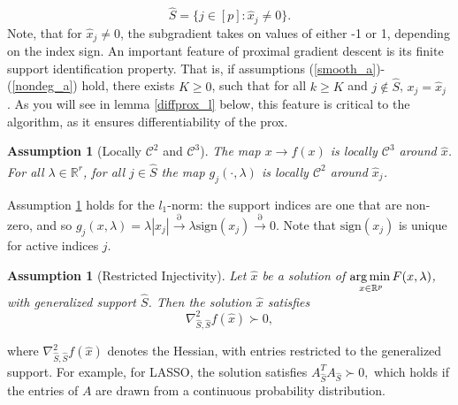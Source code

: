 \documentclass[11pt, twoside]{report}
\newtheorem{assumption}[theorem]{Assumption}
\begin{document}
\[\hat{S} = \{j \in [p]: \hat{x}_j \neq 0\}.\]
Note, that for $\hat{x}_j \neq 0$, the subgradient takes on values of either -1 or 1, depending on the index sign. An important feature of proximal gradient descent is its finite support identification property. That is, if assumptions (\ref{smooth_a})-(\ref{nondeg_a}) hold, there exists $K \geq 0$, such that for all $k \geq K$ and $j \notin \hat{S}$, $x_j = \hat{x}_j$ \cite{liang2017activity}. As you will see in lemma \ref{diffprox_l} below, this feature is critical to the algorithm, as it ensures differentiability of the prox.%
\begin{assumption}[Locally $\mathcal{C}^2$ and $\mathcal{C}^3$]
\label{locsmooth_a}
The map $x \xrightarrow[]{} f(x)$ is locally $\mathcal{C}^3$ around $\hat{x}$. For all $\lambda \in \mathbb{R}^r$, for all $j \in \hat{S}$ the map $g_j(\cdot,\lambda)$ is locally $\mathcal{C}^2$ around $\hat{x}_j$.
\end{assumption}
Assumption \ref{locsmooth_a} holds for the $l_1$-norm: the support indices are one that are non-zero, and so $g_j(x,\lambda) = \lambda|x_j| \xrightarrow[]{\partial} \lambda\mathrm{sign}(x_j) \xrightarrow[]{\partial} 0.$ Note that $\mathrm{sign}(x_j)$ is unique for active indices $j$.
\begin{assumption}[Restricted Injectivity]
\label{resinj_a}
Let $\hat{x}$ be a solution of $\underset{x \in \mathbb{R}^p} {\operatorname*{arg\, min \,}} F(x,\lambda)$, with generalized support $\hat{S}$. Then the solution $\hat{x}$ satisfies 
    \[\nabla^2_{\hat{S},\hat{S}}f(\hat{x}) \succ 0,\]
\end{assumption}
where $\nabla^2_{\hat{S},\hat{S}}f(\hat{x})$ denotes the Hessian, with entries restricted to the generalized support. For example, for LASSO, the solution satisfies $A_{\hat{S}}^TA_{\hat{S}} \succ 0,$ which holds if the entries of $A$ are drawn from a continuous probability distribution\cite{tibshirani2013lasso}.
\end{document}
